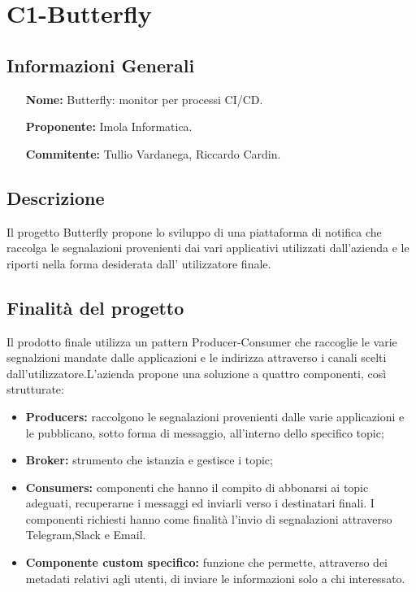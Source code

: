 \documentclass[a4paper, 11pt]{article}
\begin{document}
\section{C1-Butterfly} 
\subsection{Informazioni Generali}
\begin{itemize}
	\item[\bf Nome:] Butterfly: monitor per processi 	CI/CD.
	\item[\bf Proponente:]Imola Informatica.
	\item[\bf Commitente:]Tullio Vardanega, Riccardo 	Cardin.
\end{itemize}
\subsection{Descrizione}
Il progetto Butterfly propone lo sviluppo di una piattaforma di notifica che raccolga le segnalazioni provenienti dai vari applicativi utilizzati dall’azienda e le riporti nella forma desiderata dall’ utilizzatore finale. 
\subsection{Finalità del progetto}
Il prodotto finale utilizza un pattern Producer-Consumer che raccoglie le varie segnalzioni mandate dalle applicazioni e le indirizza attraverso i canali scelti dall’utilizzatore.L’azienda propone una soluzione a quattro componenti, così strutturate:
\begin{itemize}
\item \textbf {Producers:} raccolgono le segnalazioni provenienti dalle varie applicazioni e le pubblicano, sotto forma di messaggio, all’interno dello specifico topic;
\item \textbf {Broker:} strumento che istanzia e gestisce i topic;
\item \textbf {Consumers:} componenti che hanno il compito di abbonarsi ai topic adeguati, recuperarne i messaggi ed inviarli verso i destinatari finali. I componenti richiesti hanno come finalità l’invio di segnalazioni attraverso Telegram,Slack e Email.
\item \textbf {Componente custom specifico: }funzione che permette, attraverso dei metadati relativi agli utenti, di inviare le informazioni solo a chi interessato.
\end{itemize}
\end{document}
